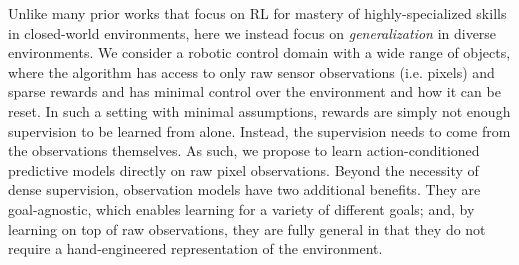 Unlike many prior works that focus on RL for mastery of highly-specialized skills in closed-world environments, here we instead focus on \emph{generalization} in diverse environments.
We consider a robotic control domain with a wide range of objects, where the algorithm has access to only raw sensor observations (i.e. pixels) and sparse rewards and has minimal control over the environment and how it can be reset. In such a setting with minimal assumptions, rewards are simply not enough supervision
to be learned from alone. Instead, the supervision needs to come from the observations themselves. As such, we propose to learn action-conditioned predictive models directly on raw pixel observations.
Beyond the necessity of dense supervision, observation models have two additional benefits. They are goal-agnostic, which enables learning for a variety of different goals; and, by learning on top of raw observations, they are fully general in that they do not require a hand-engineered representation of the environment.



